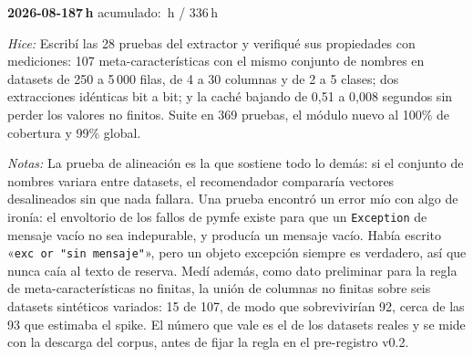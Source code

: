 \documentclass[11pt,letterpaper]{article}
\newcommand{\presupuesto}{336}
\newcommand{\horasacum}{0}
\newcommand{\entrada}[4]{%
  \xdef\horasacum{\fpeval{\horasacum + #2}}%
  \par\medskip
  \noindent\textbf{\color{tecnavy}#1}\quad\textbf{#2\,h}%
  \hfill{\small\color{gris}acumulado: \horasacum\,h / \presupuesto\,h}\par
  \nopagebreak
  \noindent\textit{Hice:} #3\par
  \nopagebreak
  \noindent\textit{Notas:} #4\par
}
\begin{document}
\entrada{2026-08-18}{7}
{Escribí las 28 pruebas del extractor y verifiqué sus propiedades con mediciones: 107
 meta-características con el mismo conjunto de nombres en datasets de 250 a 5\,000 filas,
 de 4 a 30 columnas y de 2 a 5 clases; dos extracciones idénticas bit a bit; y la caché
 bajando de 0,51 a 0,008 segundos sin perder los valores no finitos. Suite en 369 pruebas,
 el módulo nuevo al 100\% de cobertura y 99\% global.}
{La prueba de alineación es la que sostiene todo lo demás: si el conjunto de nombres
 variara entre datasets, el recomendador compararía vectores desalineados sin que nada
 fallara. Una prueba encontró un error mío con algo de ironía: el envoltorio de los fallos
 de pymfe existe para que un \texttt{Exception} de mensaje vacío no sea indepurable, y
 producía un mensaje vacío. Había escrito «\texttt{exc or "sin mensaje"}», pero un objeto
 excepción siempre es verdadero, así que nunca caía al texto de reserva. Medí además, como
 dato preliminar para la regla de meta-características no finitas, la unión de columnas no
 finitas sobre seis datasets sintéticos variados: 15 de 107, de modo que sobrevivirían 92,
 cerca de las 93 que estimaba el spike. El número que vale es el de los datasets reales y
 se mide con la descarga del corpus, antes de fijar la regla en el pre-registro v0.2.}
\end{document}
